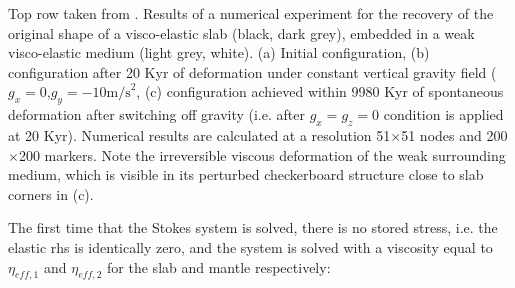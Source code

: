 \begin{center}
{\captionfont Top row taken from \cite[16.11]{gery10}. 
Results of a numerical experiment for the recovery of the original
shape of a visco-elastic slab (black, dark grey), 
 embedded in a weak visco-elastic medium (light grey, white). 
(a) Initial configuration, (b) configuration after 20 Kyr of deformation under 
constant vertical gravity field ($g_x=0$,$g_y =-10\text{m/s}^2$, 
(c) configuration achieved within 9980 Kyr of spontaneous deformation after 
switching off gravity (i.e. after $g_x=g_z=0$ condition is applied at
20 Kyr). Numerical results are calculated at a resolution 51$\times$51 nodes and
200$\times$200 markers. Note the irreversible viscous deformation of the weak surrounding medium,
which is visible in its perturbed checkerboard structure close to slab corners in (c).}
\end{center}

\newpage
The first time that the Stokes system is solved, there is no stored stress, i.e. the 
elastic rhs is identically zero, and the system is solved with a viscosity equal to
$\eta_{eff,1}$ and $\eta_{eff,2}$ for the slab and mantle respectively:

